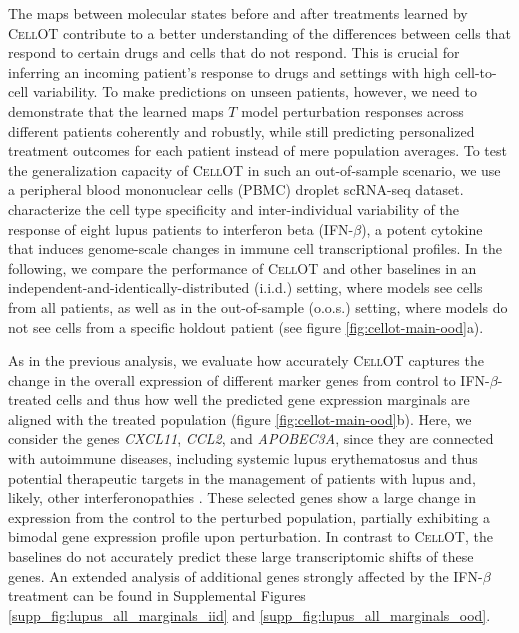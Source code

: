 The maps between molecular states before and after treatments learned by \textsc{CellOT} contribute to a better understanding of the differences between cells that respond to certain drugs and cells that do not respond. This is crucial for inferring an incoming patient's response to drugs and settings with high cell-to-cell variability.
To make predictions on unseen patients, however, we need to demonstrate that the learned maps $T$ model perturbation responses across different patients coherently and robustly, while still predicting personalized treatment outcomes for each patient instead of mere population averages.
To test the generalization capacity of \textsc{CellOT} in such an out-of-sample scenario, we use a peripheral blood mononuclear cells (PBMC) droplet scRNA-seq dataset. \citet{kang2018} characterize the cell type specificity and inter-individual variability of the response of eight lupus patients to interferon beta (IFN-$\beta$), a potent cytokine that induces genome-scale changes in immune cell transcriptional profiles.
In the following, we compare the performance of \textsc{CellOT} and other baselines in an independent-and-identically-distributed (i.i.d.) setting, where models see cells from all patients, as well as in the out-of-sample (o.o.s.) setting, where models do not see cells from a specific holdout patient (see figure \ref{fig:cellot-main-ood}a).

As in the previous analysis, we evaluate how accurately \textsc{CellOT} captures the change in the overall expression of different marker genes from control to IFN-$\beta$-treated cells and thus how well the predicted gene expression marginals are aligned with the treated population (figure \ref{fig:cellot-main-ood}b). Here, we consider the genes \textit{CXCL11}, \textit{CCL2}, and \textit{APOBEC3A},
since they are connected with autoimmune diseases, including systemic lupus erythematosus \cite{hedrich2011, perez-bercoff2021}
and thus potential therapeutic targets
in the management of patients with lupus and, likely, other interferonopathies \cite{mathian2015,rani1996,hedrich2011,mathian2015,perez-bercoff2021,flier2001}.
These selected genes show a large change in expression from the control to the perturbed population, partially exhibiting a bimodal gene expression profile upon perturbation. In contrast to \textsc{CellOT}, the baselines do not accurately predict these large transcriptomic shifts of these genes.
An extended analysis of additional genes strongly affected by the IFN-$\beta$ treatment can be found in Supplemental Figures \ref{supp_fig:lupus_all_marginals_iid} and \ref{supp_fig:lupus_all_marginals_ood}.

